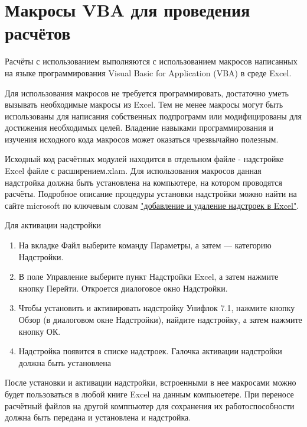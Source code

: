\chapter{Макросы VBA для проведения расчётов}

Расчёты с использованием \unf выполняются с использованием макросов написанных на языке программирования Visual Basic for Application (VBA) в среде Excel.

Для использования макросов не требуется программировать, достаточно уметь вызывать необходимые макросы из Excel. Тем не менее макросы \unf могут быть использованы для написания собственных подпрограмм или модифицированы для достижения необходимых целей. Владение навыками программирования и изучения исходного кода макросов может оказаться чрезвычайно полезным. 

Исходный код расчётных модулей находится в отдельном файле - надстройке Excel файле с расширением.xlam. Для использования макросов данная надстройка должна быть установлена на компьютере, на котором проводятся расчёты. Подробное описание процедуры установки надстройки можно найти на сайте microsoft по ключевым словам \href{https://support.office.com/ru-ru/article/%D0%94%D0%BE%D0%B1%D0%B0%D0%B2%D0%BB%D0%B5%D0%BD%D0%B8%D0%B5-%D0%B8-%D1%83%D0%B4%D0%B0%D0%BB%D0%B5%D0%BD%D0%B8%D0%B5-%D0%BD%D0%B0%D0%B4%D1%81%D1%82%D1%80%D0%BE%D0%B5%D0%BA-%D0%B2-excel-0af570c4-5cf3-4fa9-9b88-403625a0b460}{"добавление и удаление надстроек в Excel"}.

Для активации надстройки 
\begin{enumerate}
	\item На вкладке Файл выберите команду Параметры, а затем — категорию Надстройки.
	\item В поле Управление выберите пункт Надстройки Excel, а затем нажмите кнопку Перейти. Откроется диалоговое окно Надстройки.
	\item Чтобы установить и активировать надстройку Унифлок 7.1, нажмите кнопку Обзор (в диалоговом окне Надстройки), найдите надстройку, а затем нажмите кнопку ОК.
	\item Надстройка появится в списке надстроек. Галочка активации надстройки должна быть установлена
\end{enumerate}	
После установки и активации надстройки, встроенными в нее макросами можно будет пользоваться в любой книге Excel на данным компьюетере. При переносе расчётный файлов на другой комппьютер для сохранения их работоспособности должна быть передана и установлена и надстройка. 


